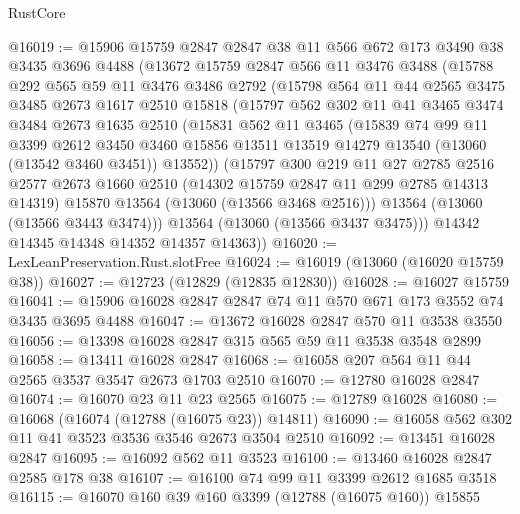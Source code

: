\begin{lexlean}{RustCore}
\begin{coremodule}
@16019 := @15906
    @15759
    @2847
    @2847
    @38
    @11
    @566
    @672
    @173
    @3490
    @38
    @3435
    @3696
    @4488
    (@13672
      @15759
      @2847
      @566
      @11
      @3476
      @3488
      (@15788
        @292
        @565
        @59
        @11
        @3476
        @3486
        @2792
        (@15798
          @564
          @11
          @44
          @2565
          @3475
          @3485
          @2673
          @1617
          @2510
          @15818
          (@15797
            @562
            @302
            @11
            @41
            @3465
            @3474
            @3484
            @2673
            @1635
            @2510
            (@15831
              @562
              @11
              @3465
              (@15839
                @74
                @99
                @11
                @3399
                @2612
                @3450
                @3460
                @15856
                @13511
                @13519
                @14279
                @13540
                (@13060 (@13542 @3460 @3451))
                @13552))
            (@15797
              @300
              @219
              @11
              @27
              @2785
              @2516
              @2577
              @2673
              @1660
              @2510
              (@14302 @15759 @2847 @11 @299 @2785 @14313 @14319)
              @15870
              @13564
              (@13060 (@13566 @3468 @2516)))
            @13564
            (@13060 (@13566 @3443 @3474)))
          @13564
          (@13060 (@13566 @3437 @3475)))
        @14342
        @14345
        @14348
        @14352
        @14357
        @14363))
@16020 := LexLeanPreservation.Rust.slotFree
@16024 := @16019 (@13060 (@16020 @15759 @38))
@16027 := @12723 (@12829 (@12835 @12830))
@16028 := @16027 @15759
@16041 := @15906 @16028 @2847 @2847 @74 @11 @570 @671 @173 @3552 @74 @3435 @3695 @4488
@16047 := @13672 @16028 @2847 @570 @11 @3538 @3550
@16056 := @13398 @16028 @2847 @315 @565 @59 @11 @3538 @3548 @2899
@16058 := @13411 @16028 @2847
@16068 := @16058 @207 @564 @11 @44 @2565 @3537 @3547 @2673 @1703 @2510
@16070 := @12780 @16028 @2847
@16074 := @16070 @23 @11 @23 @2565
@16075 := @12789 @16028
@16080 := @16068 (@16074 (@12788 (@16075 @23)) @14811)
@16090 := @16058 @562 @302 @11 @41 @3523 @3536 @3546 @2673 @3504 @2510
@16092 := @13451 @16028 @2847
@16095 := @16092 @562 @11 @3523
@16100 := @13460 @16028 @2847 @2585 @178 @38
@16107 := @16100 @74 @99 @11 @3399 @2612 @1685 @3518
@16115 := @16070 @160 @39 @160 @3399 (@12788 (@16075 @160)) @15855

\end{coremodule}
\end{lexlean}
